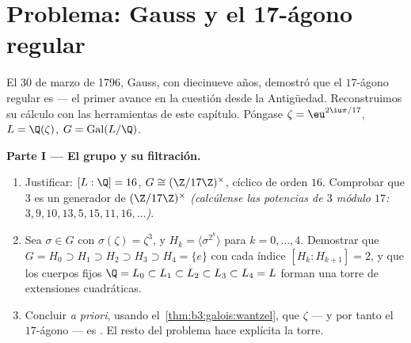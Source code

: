 \section{Problema: Gauss y el 17-ágono regular}

\begin{problem}\label{pb:b3:galois:1} El 30 de marzo de 1796, Gauss, con
diecinueve años, demostró que el $17$-ágono regular es
 --- el primer avance
en la cuestión desde la Antigüedad. Reconstruimos su cálculo con las
herramientas de este capítulo. Póngase $\zeta = \eu^{2\iu\pi/17}$, $L =
\Q(\zeta)$, $G = \operatorname{Gal}(L/\Q)$.

\medskip
\noindent\textbf{Parte I --- El grupo y su filtración.}
\begin{enumerate}
  \item Justificar: $[L:\Q] = 16$, $G \cong (\Z/17\Z)^\times$, cíclico
  de orden $16$. Comprobar que $3$ es un generador de $(\Z/17\Z)^\times$
  \emph{(calcúlense las potencias de $3$ módulo $17$:
  $3, 9, 10, 13, 5, 15, 11, 16, \dots$)}. \item Sea $\sigma \in G$ con
  $\sigma(\zeta) = \zeta^3$, y $H_k = \langle \sigma^{2^k}\rangle$ para
  $k = 0, \dots,
        4$. Demostrar que $G = H_0 \supset H_1 \supset H_2 \supset
        H_3 \supset H_4 = \{e\}$ con cada índice $[H_k :
        H_{k+1}] = 2$, y que los cuerpos fijos $\Q = L_0
        \subset L_1 \subset L_2 \subset L_3 \subset L_4 = L$ forman una
  torre de extensiones cuadráticas. \item Concluir \emph{a priori},
  usando el~\cref{thm:b3:galois:wantzel}, que $\zeta$ --- y por tanto el
  $17$-ágono --- es .
  El resto del problema hace explícita la torre.
\end{enumerate}


\end{problem}
